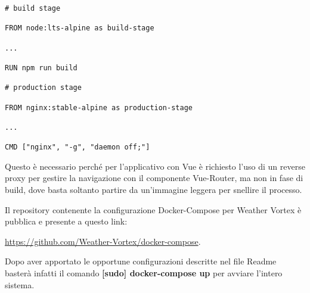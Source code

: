 \begin{lstlisting}
# build stage

FROM node:lts-alpine as build-stage

...

RUN npm run build

# production stage

FROM nginx:stable-alpine as production-stage

...

CMD ["nginx", "-g", "daemon off;"]

\end{lstlisting}

Questo è necessario perché per l'applicativo con Vue è richiesto l'uso di un reverse proxy per gestire la navigazione con il componente Vue-Router, ma non in fase di build, dove basta soltanto partire da un'immagine leggera per snellire il processo.

Il repository contenente la configurazione Docker-Compose per Weather Vortex è pubblica e presente a questo link:

\href{https://github.com/Weather-Vortex/docker-compose}{https://github.com/Weather-Vortex/docker-compose}.

Dopo aver apportato le opportune configurazioni descritte nel file Readme basterà infatti il comando \textbf{[sudo] docker-compose up} per avviare l'intero sistema.
